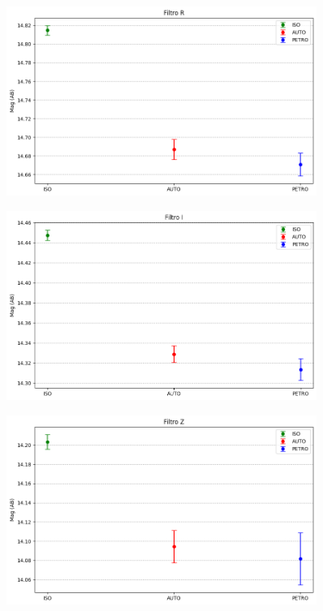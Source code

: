 \begin{anexosenv}
    \begin{figure}[h]
        \centering
        \includegraphics[width=0.9\textwidth]{Imagens/incerteza_abertura_r.png} 
        \caption[]{}
        \label{fig:incerteza_abertura_r} 
    \end{figure}

    \begin{figure}[h]
        \centering
        \includegraphics[width=0.9\textwidth]{Imagens/incerteza_abertura_i.png} 
        \caption[]{}
        \label{fig:incerteza_abertura_i} 
    \end{figure}

    \begin{figure}[h]
        \centering
        \includegraphics[width=0.9\textwidth]{Imagens/incerteza_abertura_z.png} 
        \caption[]{}
        \label{fig:incerteza_abertura_z} 
    \end{figure}


\end{anexosenv}
